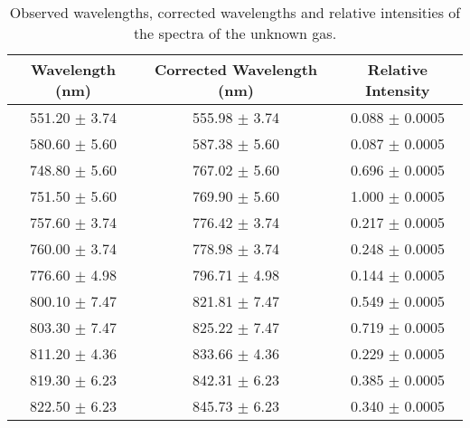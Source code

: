 \begin{table}
    \begin{adjustbox}{width=0.7\textwidth, center}
        \begin{tabular}{|c|c|c|}
            \hline
            Wavelength (nm)                     & Corrected Wavelength (nm) & Relative Intensity  \\
            \hline
            \rowcolor{red!8}551.20 $\pm$ 3.74   & 555.98 $\pm$ 3.74         & 0.088  $\pm$ 0.0005 \\
            \rowcolor{red!8}580.60 $\pm$ 5.60   & 587.38 $\pm$ 5.60         & 0.087  $\pm$ 0.0005 \\
            \rowcolor{red!69}748.80 $\pm$ 5.60  & 767.02 $\pm$ 5.60         & 0.696  $\pm$ 0.0005 \\
            \rowcolor{red!100}751.50 $\pm$ 5.60 & 769.90 $\pm$ 5.60         & 1.000  $\pm$ 0.0005 \\
            \rowcolor{red!21}757.60 $\pm$ 3.74  & 776.42 $\pm$ 3.74         & 0.217  $\pm$ 0.0005 \\
            \rowcolor{red!24}760.00 $\pm$ 3.74  & 778.98 $\pm$ 3.74         & 0.248  $\pm$ 0.0005 \\
            \rowcolor{red!14}776.60 $\pm$ 4.98  & 796.71 $\pm$ 4.98         & 0.144  $\pm$ 0.0005 \\
            \rowcolor{red!54}800.10 $\pm$ 7.47  & 821.81 $\pm$ 7.47         & 0.549  $\pm$ 0.0005 \\
            \rowcolor{red!71}803.30 $\pm$ 7.47  & 825.22 $\pm$ 7.47         & 0.719  $\pm$ 0.0005 \\
            \rowcolor{red!22}811.20 $\pm$ 4.36  & 833.66 $\pm$ 4.36         & 0.229  $\pm$ 0.0005 \\
            \rowcolor{red!38}819.30 $\pm$ 6.23  & 842.31 $\pm$ 6.23         & 0.385  $\pm$ 0.0005 \\
            \rowcolor{red!34}822.50 $\pm$ 6.23  & 845.73 $\pm$ 6.23         & 0.340  $\pm$ 0.0005 \\
            \hline
        \end{tabular}
    \end{adjustbox}
    \caption{Observed wavelengths, corrected wavelengths and relative intensities of the spectra of the unknown gas.}
    \label{tab:unknown}
\end{table}